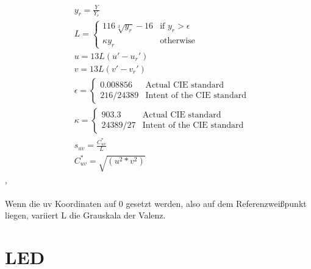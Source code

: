 \documentclass[11pt]{scrartcl}
\begin{document}
\begin{align}\label{Equ:10}
    &y_r = \frac{Y}{Y_r}\\
    &L = \left\{
        \begin{array}{ll}
            116 \sqrt[3]{y_r} - 16 & \text{if } y_r > \epsilon \\
            \kappa y_r & \text{otherwise}
        \end{array}
        \right.\\
    &u = 13 L (u' - u_r')\\
    &v = 13 L (v' - v_r')\\
    &\epsilon = \left\{
        \begin{array}{ll}
            {0.008856} & \text{Actual CIE standard} \\
            {216 / 24389} & \text{Intent of the CIE standard}
        \end{array}
        \right.\\
    &\kappa = \left\{
        \begin{array}{ll}
            {903.3} & \text{Actual CIE standard} \\
            {24389 / 27} & \text{Intent of the CIE standard}
        \end{array}
        \right.\\
    &s_{uv} = \frac{C^*_{uv}}{L}\\
    &C^*_{uv} = \sqrt{(u^2*v^2)}
\end{align}
\cite{lindbloom}, \cite{wikipedia1976}\\
\\
Wenn die uv Koordinaten auf 0 gesetzt werden, also auf dem Referenzweißpunkt liegen, variiert L die Grauskala der Valenz. \cite{wisotopLuv}
\clearpage
\section{LED}
\end{document}
